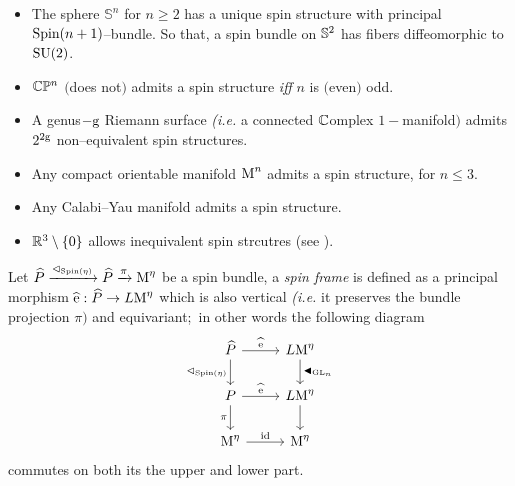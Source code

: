 \begin{example}
    \begin{itemize}
    \item The sphere $\mathbb{S}^n$ for $n\geq2$ has a unique spin structure with principal $\Spin(n+1)$--bundle. So that, a spin bundle on $\S^2$ has fibers diffeomorphic to $\SU(2)$.
    \item $\C\mathbb{P}^n$ $($does not$)$ admits a spin structure \emph{iff} $n$ is $($even$)$ odd.
    \item A genus$-\g$ Riemann surface \emph{(i.e.} a connected $\C$omplex $1-$manifold$)$ admits $2^{2\g}$ non--equivalent spin structures.
    \item Any compact orientable manifold $\M^n$ admits a spin structure, for $n\leq3$.
    \item Any Calabi--Yau manifold admits a spin structure.
    \item $\R^3\setminus\{0\}$ allows inequivalent spin strcutres (see \emph{\cite{jadwisin}}).
\end{itemize}
\end{example}


\begin{defi}
    Let $\widehat{P}\xrightarrow{\vartriangleleft_{\Spin(\eta)}}\widehat{P}\xrightarrow{\pi}\M^\eta$ be a spin bundle, a \emph{spin frame} is defined as a principal morphism $\widehat{\e}:\widehat{P}\to L\M^\eta$ which is also vertical \emph{(i.e.} it preserves the bundle projection $\pi)$ and equivariant;\, in other words the following diagram
    \[\begin{tikzcd}
\widehat{P}\arrow{r}{\widehat{\e}} \arrow[swap]{d}{\vartriangleleft_{\Spin(\eta)}} & L\M^\eta \arrow{d}{\blacktriangleleft_{\GL_n}} \\
P\arrow{r}{\widehat{\e}}\arrow[swap]{d}{\pi} & L\M^\eta\arrow[swap]{d} \\
\M^\eta\arrow{r}{\id} & \M^\eta
\end{tikzcd}
\]   
    commutes on both its the upper and lower part.
\end{defi}

